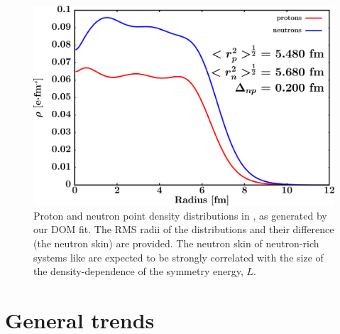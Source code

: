 \begin{figure}[tb]
    \centering
    \includegraphics[width=\textwidth]{figures/pb208_matterDensity.png}
    \caption[Proton and neutron matter density distributions in \pbEight]
    {
        Proton and neutron point density distributions in \pbEight, as
        generated by our DOM fit. The RMS radii of the distributions and their
        difference (the neutron skin) are provided. The neutron skin of
        neutron-rich systems like \pbEight are expected to be strongly correlated
        with the size of the density-dependence of the symmetry energy, $L$.
    }
    \label{Pb208MatterDistribution}
\end{figure}

\section{General trends}

